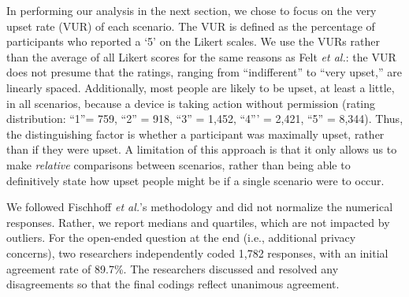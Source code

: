 In performing our analysis in the next section, we chose to focus on the very upset rate (VUR) of each scenario.  The VUR is defined as the percentage of participants who reported a `5' on the Likert scales. 
We use the VURs rather than the average of all Likert scores for the same reasons as Felt {\it et al.}: the VUR does not presume that the ratings, ranging from ``indifferent'' to ``very upset,'' are linearly spaced. Additionally, most people are likely to be upset, at least a little, in all scenarios, because a device is taking action without permission (rating distribution: ``1''= 759, ``2'' = 918, ``3'' = 1,452, ``4''' = 2,421, ``5'' = 8,344). Thus, the distinguishing factor is whether a participant was maximally upset, rather than if they were upset. A limitation of this approach is that it only allows us to make {\it relative} comparisons between scenarios, rather than being able to definitively state how upset people might be if a single scenario were to occur.

We followed Fischhoff {\it et al.}'s methodology and did not normalize the numerical responses. Rather, we report medians and quartiles, which are not impacted by outliers. For the open-ended question at the end (i.e., additional privacy concerns), two researchers independently coded 1,782 responses, with an initial agreement rate of 89.7\%. The researchers discussed and resolved any disagreements so that the final codings reflect unanimous agreement.
